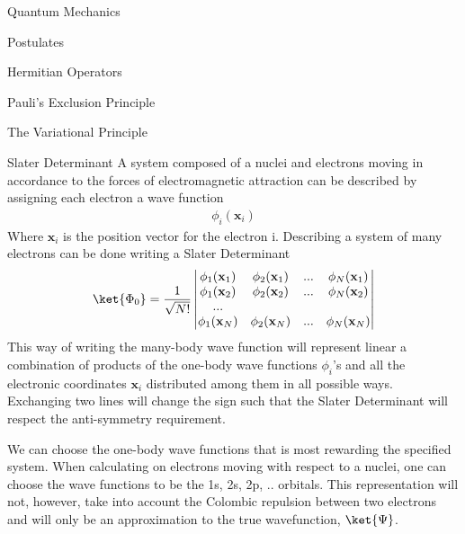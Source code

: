 \documentclass[twoside,english]{uiofysmaster}
\begin{document}
\begin{chapter}{Quantum Mechanics}
 
 \begin{section}{Postulates}
 	
 \end{section}

 \begin{section}{Hermitian Operators}
 	
 \end{section}

 \begin{section}{Pauli's Exclusion Principle}
 	
 \end{section}

	\begin{section}{The Variational Principle}

	\end{section}

	\begin{section}{Slater Determinant}
		A system composed of a nuclei and electrons moving in accordance to the forces of electromagnetic attraction can be described by assigning each electron
		a wave function 
		\begin{align}
			\phi_i(\mathbf{x}_i)
		\end{align}
		Where $\mathbf{x}_i$ is the position vector for the electron i. Describing a system of many electrons can be done writing a Slater Determinant
		\begin{align}
			\ket{\Phi_0} = \frac{1}{ \sqrt{N!} } \left|\begin{matrix}
				\phi_1(\mathbf{x}_1) & \phi_2(\mathbf{x}_1) & ... & \phi_N(\mathbf{x}_1) \\
				\phi_1(\mathbf{x}_2) & \phi_2(\mathbf{x}_2) & ... & \phi_N(\mathbf{x}_2) \\
				... & & & \\
				\phi_1(\mathbf{x}_N) & \phi_2(\mathbf{x}_N) & ... & \phi_N(\mathbf{x}_N) 
			\end{matrix} \right|
		\end{align}
		This way of writing the many-body wave function will represent linear a combination of products of the one-body wave functions $\phi_i$'s and all the electronic coordinates
		$\mathbf{x}_i$ distributed among them in all possible ways. Exchanging two lines will change the sign such that the Slater Determinant will respect the anti-symmetry 
		requirement. \par
		We can choose the one-body wave functions that is most rewarding the specified system. When calculating on electrons moving with respect to a nuclei, one can choose the wave
		functions to be the 1s, 2s, 2p, .. orbitals. This representation will not, however, take into account the Colombic repulsion between two electrons and will only be an 
		approximation to the true wavefunction, $\ket{\Psi}$.
	\end{section}

\end{chapter}
\end{document}
